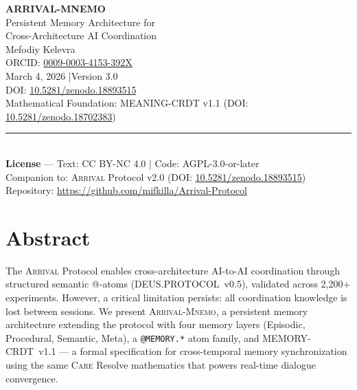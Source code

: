 \documentclass[11pt,a4paper]{article}
\newcommand{\arrival}{\textsc{Arrival}\xspace}
\newcommand{\mnemo}{\textsc{Arrival-Mnemo}\xspace}
\newcommand{\care}{\textsc{Care}\xspace}
\begin{document}
\begin{titlepage}
\centering
\vspace*{2cm}

{\Huge\bfseries ARRIVAL-MNEMO}\\[0.6cm]
{\Large Persistent Memory Architecture for\\
Cross-Architecture AI Coordination}\\[2.5cm]

{\large Mefodiy Kelevra}\\[0.3cm]
{\small ORCID:
  \href{https://orcid.org/0009-0003-4153-392X}{0009-0003-4153-392X}}\\[2cm]

{\normalsize March 4, 2026 \enspace|\enspace Version 3.0}\\[0.5cm]
{\small DOI: \href{https://doi.org/10.5281/zenodo.18893515}%
  {10.5281/zenodo.18893515}}\\[0.3cm]
{\small Mathematical Foundation: MEANING-CRDT v1.1
  (DOI: \href{https://doi.org/10.5281/zenodo.18702383}%
  {10.5281/zenodo.18702383})}\\[2cm]

\rule{0.6\textwidth}{0.4pt}\\[0.8cm]

{\footnotesize
  \textbf{License} — Text: CC BY-NC 4.0 \enspace|\enspace
  Code: AGPL-3.0-or-later\\[0.4cm]
  Companion to: \arrival Protocol v2.0
  (DOI: \href{https://doi.org/10.5281/zenodo.18893515}%
  {10.5281/zenodo.18893515})\\[0.2cm]
  Repository:
  \url{https://github.com/mifkilla/Arrival-Protocol}
}

\vfill
\end{titlepage}

\tableofcontents
\newpage

\section{Abstract}

The \arrival Protocol enables cross-architecture AI-to-AI coordination
through structured semantic @-atoms (DEUS.PROTOCOL~v0.5), validated
across 2,200+ experiments.  However, a critical limitation persists: all
coordination knowledge is lost between sessions.  We present \mnemo, a
persistent memory architecture extending the protocol with four memory
layers (Episodic, Procedural, Semantic, Meta), a \texttt{@MEMORY.*} atom
family, and MEMORY-CRDT~v1.1 --- a formal specification for
cross-temporal memory synchronization using the same \care Resolve
mathematics that powers real-time dialogue convergence.
\end{document}
